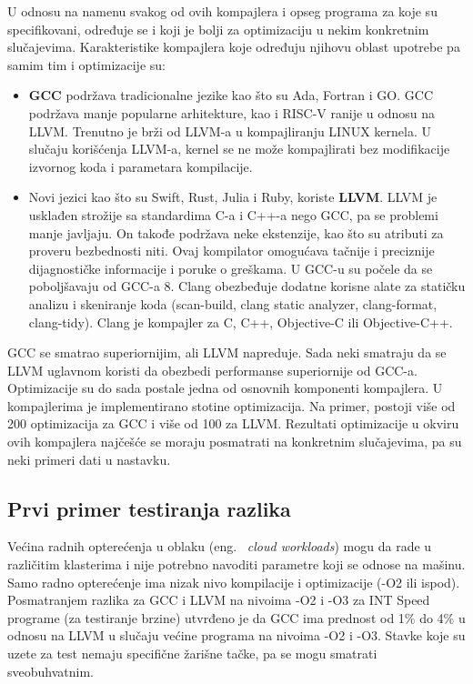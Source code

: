 \documentclass[a4paper]{article}
\begin{document}
U odnosu na namenu svakog od ovih kompajlera  i opseg programa za koje su specifikovani, određuje se i koji je bolji za optimizaciju u nekim konkretnim slučajevima.
Karakteristike kompajlera koje određuju njihovu oblast upotrebe pa samim tim i optimizacije su: 
\begin{itemize}
  \item \textbf{GCC} podržava tradicionalne jezike kao što su Ada, Fortran i GO.
         GCC podržava manje popularne arhitekture, kao i RISC-V ranije u odnosu na LLVM.
         Trenutno je brži od LLVM-a u  kompajliranju LINUX kernela. 
         U slučaju korišćenja LLVM-a, kernel se ne može kompajlirati bez modifikacije izvornog koda i parametara kompilacije.
  \item  Novi jezici  kao što su Swift, Rust, Julia i Ruby, koriste \textbf{LLVM}.
          LLVM je usklađen strožije sa standardima C-a i C++-a nego GCC, pa se problemi manje javljaju.
          On takođe podržava neke ekstenzije, kao što su atributi za proveru bezbednosti niti.
          Ovaj kompilator omogućava tačnije i preciznije dijagnostičke informacije i poruke o greškama. U GCC-u su počele da se poboljšavaju od GCC-a 8.
          Clang obezbeđuje dodatne korisne alate za statičku analizu i skeniranje koda (scan-build, clang static analyzer, clang-format, clang-tidy).
          Clang je kompajler  za C, C++, Objective-C ili Objective-C++.
\end{itemize}
GCC se smatrao superiornijim, ali LLVM napreduje. Sada neki smatraju da se LLVM uglavnom koristi da obezbedi performanse superiornije od GCC-a.
\\ Optimizacije su do sada postale jedna od osnovnih komponenti kompa\-jlera. 
U kompajlerima je implementirano stotine optimizacija. 
Na primer, postoji više od 200 optimizacija za GCC i više od 100 za LLVM.  
Rezultati optimizacije u okviru ovih kompajlera najčešće se moraju posmatrati na konkretnim slučajevima, pa  su neki primeri dati u nastavku.

\subsection{Prvi primer testiranja razlika}
\label{subsec:primer1}
Većina radnih opterećenja u oblaku (eng. ~{\em cloud workloads}) mogu da rade u različitim klasterima i nije potrebno navoditi parametre koji se odnose na mašinu. 
Samo radno opterećenje ima nizak nivo kompilacije i optimizacije (-O2 ili ispod).
Posmatranjem razlika za GCC i LLVM na nivoima -O2 i -O3 za INT Speed programe (za testiranje brzine) utvrđeno je da 
GCC ima prednost od 1\% do 4\% u odnosu na LLVM u slučaju većine programa na nivoima -O2 i -O3. 
Stavke koje su uzete za test nemaju specifične žarišne tačke, pa se mogu smatrati sveobuhvatnim.
\end{document}

